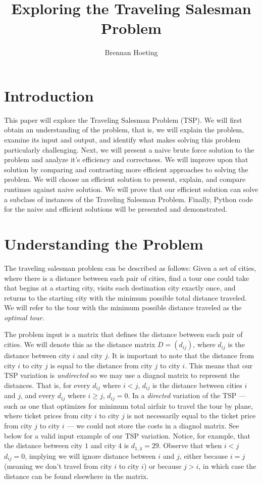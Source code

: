 \documentclass{article}
\begin{document}
\title{Exploring the Traveling Salesman Problem}
\author{Brennan Hoeting}
\date{}
\maketitle 

\section*{Introduction}
This paper will explore the Traveling Salesman Problem (TSP).
We will first obtain an understanding of the problem, that
is, we will explain the problem, examine its input and output,
and identify what makes solving this problem particularly
challenging.  Next, we will present a naive brute force solution
to the problem and analyze it's efficiency and correctness.  We
will improve upon that solution by comparing and contrasting
more efficient approaches to solving the problem.  We will choose
an efficient solution to present, explain, and compare runtimes
against naive solution.  We will prove that our efficient solution
can solve a subclass of instances of the Traveling Salesman Problem.
Finally, Python code for the naive and efficient solutions will be
presented and demonstrated.

\section*{Understanding the Problem}
The traveling salesman problem can be described as follows:
Given a set of cities, where there is a distance between
each pair of cities, find a tour one could take that 
begins at a starting city, visits each destination city
exactly once, and returns to the starting city with the
minimum possible total distance traveled.  We will refer
to the tour with the minimum possible distance traveled
as the \textit{optimal tour}.
\par

The problem input is a matrix that defines the distance
between each pair of cities.  We will denote this as
the distance matrix $D = (d_{ij})$, where $d_{ij}$ is
the distance between city $i$ and city $j$.  It is important
to note that the distance from city $i$ to city $j$ is equal
to the distance from city $j$ to city $i$. This means that our 
TSP variation is \textit{undirected} so we may use a diagnol 
matrix to represent the distances.  That is, for every $d_{ij}$ 
where $i<j$, $d_{ij}$ is the distance between cities $i$ and $j$,
and every $d_{ij}$ where $i\geq j$, $d_{ij} = 0$.  In a \textit{directed}
variation of the TSP --- such as one that optimizes for minimum total
airfair to travel the tour by plane, where ticket prices from city
$i$ to city $j$ is not necessarily equal to the ticket price from 
city $j$ to city $i$ --- we could not store the costs in a diagnol
matrix.  See below for a valid input example of our TSP variation.
Notice, for example, that the distance between city $1$ and city $4$
is $d_{1,4}=29$.  Observe that when $i<j$ $d_{ij}=0$, implying
we will ignore distance between $i$ and $j$, either because $i=j$
(meaning we don't travel from city $i$ to city $i$) or because $j>i$,
in which case the distance can be found elsewhere in the matrix.
\par
\end{document}

